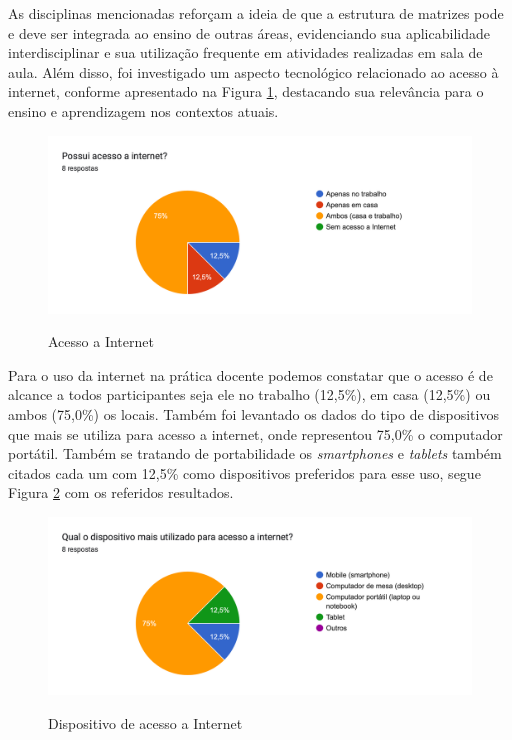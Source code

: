 As disciplinas mencionadas reforçam a ideia de que a estrutura de matrizes pode e deve ser integrada ao ensino de outras áreas, evidenciando sua aplicabilidade interdisciplinar e sua utilização frequente em atividades realizadas em sala de aula. Além disso, foi investigado um aspecto tecnológico relacionado ao acesso à internet, conforme apresentado na Figura \ref{fig:acesso_internet}, destacando sua relevância para o ensino e aprendizagem nos contextos atuais.

\begin{figure}[h!]
    \caption{Acesso a Internet}
    \centering
    \includegraphics[scale=0.2]{figuras/resultados/acesso_internet.png}
    \label{fig:acesso_internet}
\end{figure}

Para o uso da internet na prática docente podemos constatar que o acesso é de alcance a todos participantes seja ele no trabalho (12,5\%), em casa (12,5\%) ou ambos (75,0\%) os locais. Também foi levantado os dados do tipo de dispositivos que mais se utiliza para acesso a internet, onde representou 75,0\% o computador portátil. Também se tratando de portabilidade os \textit{smartphones} e \textit{tablets} também citados cada um com 12,5\% como dispositivos preferidos para esse uso, segue Figura \ref{fig:dispositivo_acesso_internet} com os referidos resultados.

\begin{figure}[h!]
    \caption{Dispositivo de acesso a Internet}
    \centering
    \includegraphics[scale=0.2]{figuras/resultados/dispositivo_acesso_internet.png}
    \label{fig:dispositivo_acesso_internet}
\end{figure}



